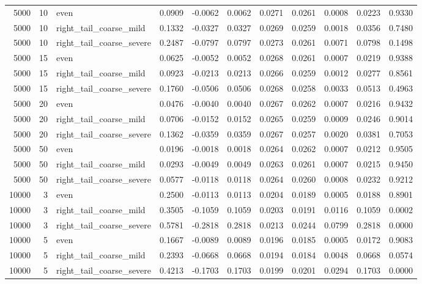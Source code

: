 \begin{table}[!h]
{\begin{tabular}[t]{rrlrrrrrrrr}
5000 & 10 & even & 0.0909 & -0.0062 & 0.0062 & 0.0271 & 0.0261 & 0.0008 & 0.0223 & 0.9330\\
5000 & 10 & right\_tail\_coarse\_mild & 0.1332 & -0.0327 & 0.0327 & 0.0269 & 0.0259 & 0.0018 & 0.0356 & 0.7480\\
5000 & 10 & right\_tail\_coarse\_severe & 0.2487 & -0.0797 & 0.0797 & 0.0273 & 0.0261 & 0.0071 & 0.0798 & 0.1498\\
5000 & 15 & even & 0.0625 & -0.0052 & 0.0052 & 0.0268 & 0.0261 & 0.0007 & 0.0219 & 0.9388\\
5000 & 15 & right\_tail\_coarse\_mild & 0.0923 & -0.0213 & 0.0213 & 0.0266 & 0.0259 & 0.0012 & 0.0277 & 0.8561\\
5000 & 15 & right\_tail\_coarse\_severe & 0.1760 & -0.0506 & 0.0506 & 0.0268 & 0.0258 & 0.0033 & 0.0513 & 0.4963\\
5000 & 20 & even & 0.0476 & -0.0040 & 0.0040 & 0.0267 & 0.0262 & 0.0007 & 0.0216 & 0.9432\\
5000 & 20 & right\_tail\_coarse\_mild & 0.0706 & -0.0152 & 0.0152 & 0.0265 & 0.0259 & 0.0009 & 0.0246 & 0.9014\\
5000 & 20 & right\_tail\_coarse\_severe & 0.1362 & -0.0359 & 0.0359 & 0.0267 & 0.0257 & 0.0020 & 0.0381 & 0.7053\\
5000 & 50 & even & 0.0196 & -0.0018 & 0.0018 & 0.0264 & 0.0262 & 0.0007 & 0.0212 & 0.9505\\
5000 & 50 & right\_tail\_coarse\_mild & 0.0293 & -0.0049 & 0.0049 & 0.0263 & 0.0261 & 0.0007 & 0.0215 & 0.9450\\
5000 & 50 & right\_tail\_coarse\_severe & 0.0577 & -0.0118 & 0.0118 & 0.0264 & 0.0260 & 0.0008 & 0.0232 & 0.9212\\
10000 & 3 & even & 0.2500 & -0.0113 & 0.0113 & 0.0204 & 0.0189 & 0.0005 & 0.0188 & 0.8901\\
10000 & 3 & right\_tail\_coarse\_mild & 0.3505 & -0.1059 & 0.1059 & 0.0203 & 0.0191 & 0.0116 & 0.1059 & 0.0002\\
10000 & 3 & right\_tail\_coarse\_severe & 0.5781 & -0.2818 & 0.2818 & 0.0213 & 0.0244 & 0.0799 & 0.2818 & 0.0000\\
10000 & 5 & even & 0.1667 & -0.0089 & 0.0089 & 0.0196 & 0.0185 & 0.0005 & 0.0172 & 0.9083\\
10000 & 5 & right\_tail\_coarse\_mild & 0.2393 & -0.0668 & 0.0668 & 0.0194 & 0.0184 & 0.0048 & 0.0668 & 0.0574\\
10000 & 5 & right\_tail\_coarse\_severe & 0.4213 & -0.1703 & 0.1703 & 0.0199 & 0.0201 & 0.0294 & 0.1703 & 0.0000\\

\end{tabular}}
\end{table}
